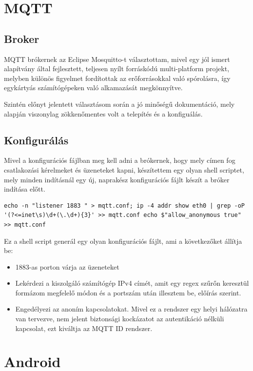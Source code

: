 \documentclass[
]{thesis-ekf}
\theoremstyle{definition}
\theoremstyle{remark}
\begin{document}
\section{MQTT}
\subsection{Broker}
MQTT brókernek az Eclipse Mosquitto\cite{mosquitto}-t választottam, mivel egy jól ismert alapítvány által fejlesztett, teljesen nyílt forráskódú multi-platform projekt,
melyben különös figyelmet fordítottak az erőforrásokkal való spórolásra, így egykártyás számítógépeken való alkamazását megkönnyítve. 

Szintén előnyt jelentett választásom során a jó minőségű dokumentáció, mely alapján
viszonylag zökkenőmentes volt a telepítés és a konfiguálás.
\subsection{Konfigurálás}
Mivel a konfigurációs fájlban meg kell adni a brókernek, hogy mely címen fog csatlakozási kérelmeket és üzeneteket kapni,
készítettem egy olyan shell scriptet, mely minden indításnál egy új, naprakész konfigurációs fájlt készít a bróker indítása előtt.

\lstset{language=bash} 
\label{configGenerator}
\begin{lstlisting}[frame=single]
echo -n "listener 1883 " > mqtt.conf; ip -4 addr show eth0 | grep -oP '(?<=inet\s)\d+(\.\d+){3}' >> mqtt.conf echo $"allow_anonymous true" >> mqtt.conf
\end{lstlisting}

Ez a shell script generál egy olyan konfigurációs fájlt, ami a következőket állítja be:
\begin{itemize}
	\item 1883-as porton várja az üzeneteket
	\item Lekérdezi a kiszolgáló számítógép IPv4 címét, amit egy regex szűrőn keresztül formázom megfelelő módon és a portszám után illesztem be, előírás szerint.
	\item Engedélyezi az anoním kapcsolatokat. Mivel ez a rendszer egy helyi hálózatra van tervezve, nem jelent biztonsági kockázatot az autentikáció nélküli kapcsolat, ezt kiváltja az MQTT ID rendszer.
\end{itemize}

\section{Android}
\end{document}
